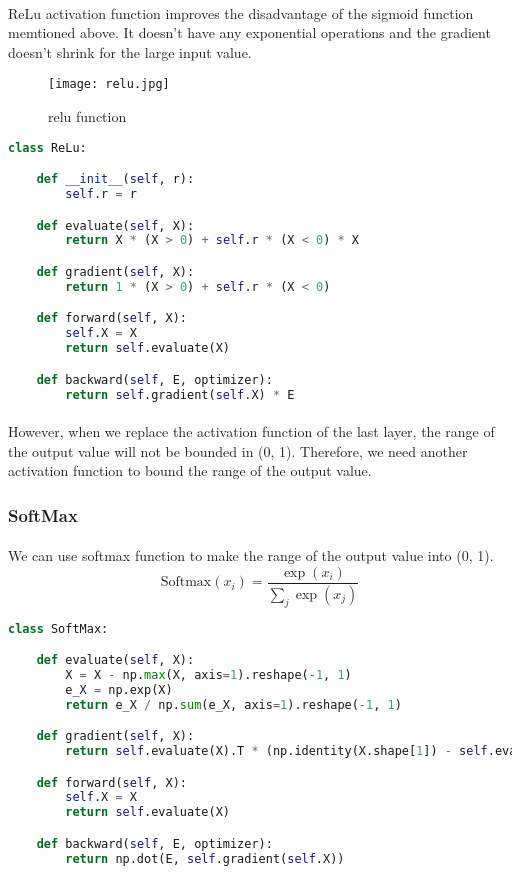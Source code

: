 \paragraph{}
ReLu activation function improves the disadvantage of the sigmoid function memtioned above. It doesn't have any exponential operations and the gradient doesn't shrink for the large input value.
\begin{figure}[!ht]
\begin{center} 
\texttt{[image: relu.jpg]} 
\caption{relu function}
\end{center} 
\end{figure}
\begin{lstlisting}[language=Python]
class ReLu:

    def __init__(self, r):
        self.r = r

    def evaluate(self, X):
        return X * (X > 0) + self.r * (X < 0) * X

    def gradient(self, X):
        return 1 * (X > 0) + self.r * (X < 0)

    def forward(self, X):
        self.X = X
        return self.evaluate(X)

    def backward(self, E, optimizer):
        return self.gradient(self.X) * E
\end{lstlisting}
\paragraph{}
However, when we replace the activation function of the last layer, the range of the output value will not be bounded in (0, 1). Therefore, we need another activation function to bound the range of the output value.

\subsubsection{SoftMax}
\paragraph{}
We can use softmax function to make the range of the output value into (0, 1).
$$\text{Softmax}(x_{i}) = \frac{\exp(x_i)}{\sum_j \exp(x_j)}$$
\begin{lstlisting}[language=Python]
class SoftMax:

    def evaluate(self, X):
        X = X - np.max(X, axis=1).reshape(-1, 1)
        e_X = np.exp(X)
        return e_X / np.sum(e_X, axis=1).reshape(-1, 1)

    def gradient(self, X):
        return self.evaluate(X).T * (np.identity(X.shape[1]) - self.evaluate(X))

    def forward(self, X):
        self.X = X
        return self.evaluate(X)

    def backward(self, E, optimizer):
        return np.dot(E, self.gradient(self.X))
\end{lstlisting}
